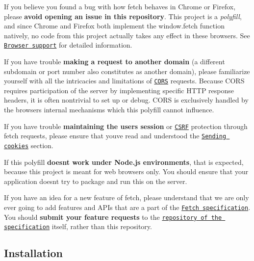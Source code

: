 \begin{DoxyItemize}
\item If you believe you found a bug with how {\ttfamily fetch} behaves in Chrome or Firefox, please {\bfseries avoid opening an issue in this repository}. This project is a {\itshape polyfill}, and since Chrome and Firefox both implement the {\ttfamily window.\+fetch} function natively, no code from this project actually takes any effect in these browsers. See \href{#browser-support}{\tt Browser support} for detailed information.
\item If you have trouble {\bfseries making a request to another domain} (a different subdomain or port number also constitutes as another domain), please familiarize yourself with all the intricacies and limitations of \href{https://developer.mozilla.org/en-US/docs/Web/HTTP/Access_control_CORS}{\tt C\+O\+RS} requests. Because C\+O\+RS requires participation of the server by implementing specific H\+T\+TP response headers, it is often nontrivial to set up or debug. C\+O\+RS is exclusively handled by the browser\textquotesingle{}s internal mechanisms which this polyfill cannot influence.
\item If you have trouble {\bfseries maintaining the user\textquotesingle{}s session} or \href{https://www.owasp.org/index.php/Cross-Site_Request_Forgery_(CSRF)_Prevention_Cheat_Sheet}{\tt C\+S\+RF} protection through {\ttfamily fetch} requests, please ensure that you\textquotesingle{}ve read and understood the \href{#sending-cookies}{\tt Sending cookies} section.
\item If this polyfill {\bfseries doesn\textquotesingle{}t work under Node.\+js environments}, that is expected, because this project is meant for web browsers only. You should ensure that your application doesn\textquotesingle{}t try to package and run this on the server.
\item If you have an idea for a new feature of {\ttfamily fetch}, please understand that we are only ever going to add features and A\+P\+Is that are a part of the \href{https://fetch.spec.whatwg.org}{\tt Fetch specification}. You should {\bfseries submit your feature requests} to the \href{https://github.com/whatwg/fetch/issues}{\tt repository of the specification} itself, rather than this repository.
\end{DoxyItemize}

\subsection*{Installation}


